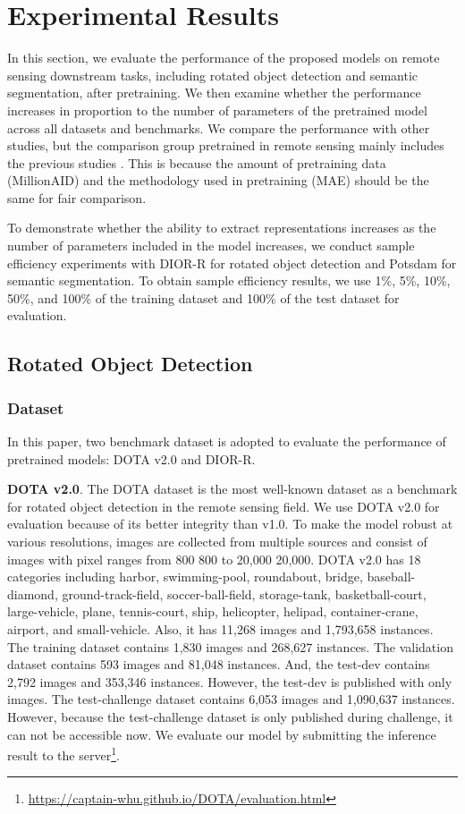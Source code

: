 \section{Experimental Results}

In this section, we evaluate the performance of the proposed models on remote sensing downstream tasks, including rotated object detection and semantic segmentation, after pretraining. We then examine whether the performance increases in proportion to the number of parameters of the pretrained model across all datasets and benchmarks. We compare the performance with other studies, but the comparison group pretrained in remote sensing mainly includes the previous studies \cite{wang2022advancing}. This is because the amount of pretraining data (MillionAID) and the methodology used in pretraining (MAE) should be the same for fair comparison.

To demonstrate whether the ability to extract representations increases as the number of parameters included in the model increases, we conduct sample efficiency experiments with DIOR-R for rotated object detection and Potsdam for semantic segmentation. To obtain sample efficiency results, we use 1\%, 5\%, 10\%, 50\%, and 100\% of the training dataset and 100\% of the test dataset for evaluation.

\subsection{Rotated Object Detection}

\subsubsection{Dataset}

In this paper, two benchmark dataset is adopted to evaluate the performance of pretrained models: DOTA v2.0\cite{ding2021object} and DIOR-R\cite{cheng2022anchor}.

\textbf{DOTA v2.0}. The DOTA dataset is the most well-known dataset as a benchmark for rotated object detection in the remote sensing field. We use DOTA v2.0 for evaluation because of its better integrity than v1.0. To make the model robust at various resolutions, images are collected from multiple sources and consist of images with pixel ranges from 800  800 to 20,000  20,000. DOTA v2.0 has 18 categories including harbor, swimming-pool, roundabout, bridge, baseball-diamond, ground-track-field, soccer-ball-field, storage-tank, basketball-court, large-vehicle, plane, tennis-court, ship, helicopter, helipad, container-crane, airport, and small-vehicle. Also, it has 11,268 images and 1,793,658 instances. The training dataset contains 1,830 images and 268,627 instances. The validation dataset contains 593 images and 81,048 instances. And, the test-dev contains 2,792 images and 353,346 instances. However, the test-dev is published with only images. The test-challenge dataset contains 6,053 images and 1,090,637 instances. However, because the test-challenge dataset is only published during challenge, it can not be accessible now. We evaluate our model by submitting the inference result to the server\footnote{\url{https://captain-whu.github.io/DOTA/evaluation.html}}.

